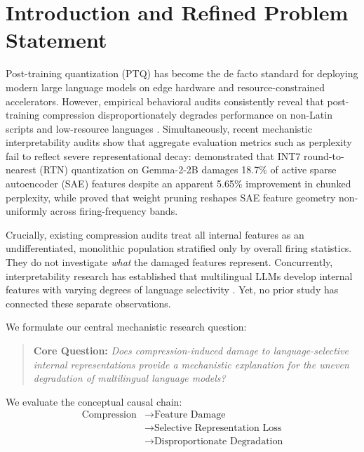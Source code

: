 \documentclass[11pt]{article}
\begin{document}
\section{Introduction and Refined Problem Statement}
Post-training quantization (PTQ) has become the de facto standard for deploying modern large language models on edge hardware and resource-constrained accelerators. However, empirical behavioral audits consistently reveal that post-training compression disproportionately degrades performance on non-Latin scripts and low-resource languages \citep{marchisio2024quantization, marie2025uneven, soualhi2026multilingual}. Simultaneously, recent mechanistic interpretability audits show that aggregate evaluation metrics such as perplexity fail to reflect severe representational decay: \citet{duan2026perplexity} demonstrated that INT7 round-to-nearest (RTN) quantization on Gemma-2-2B damages 18.7\% of active sparse autoencoder (SAE) features despite an apparent 5.65\% improvement in chunked perplexity, while \citet{borobia2026how} proved that weight pruning reshapes SAE feature geometry non-uniformly across firing-frequency bands.

Crucially, existing compression audits treat all internal features as an undifferentiated, monolithic population stratified only by overall firing statistics. They do not investigate \emph{what} the damaged features represent. Concurrently, interpretability research has established that multilingual LLMs develop internal features with varying degrees of language selectivity \citep{deng2025unveiling, sin2025uncovering}. Yet, no prior study has connected these separate observations.

We formulate our central mechanistic research question:
\begin{quote}
\textbf{Core Question:} \emph{Does compression-induced damage to language-selective internal representations provide a mechanistic explanation for the uneven degradation of multilingual language models?}
\end{quote}

We evaluate the conceptual causal chain:
\begin{equation}
\label{eq:chain}
\boxed{
\begin{aligned}
\text{Compression} &\longrightarrow \text{Feature Damage} \\
&\longrightarrow \text{Selective Representation Loss} \\
&\longrightarrow \text{Disproportionate Degradation}
\end{aligned}
}
\end{equation}
\end{document}
